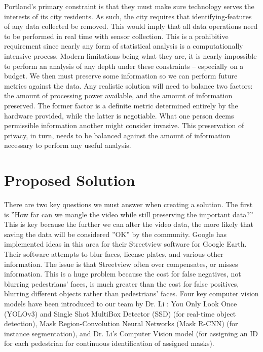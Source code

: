 Portland's primary constraint is that they must make sure technology serves the interests of its city residents. As such, the city requires that identifying-features of any data collected be removed. This would imply that all data operations need to be performed in real time with sensor collection. This is a prohibitive requirement since nearly any form of statistical analysis is a computationally intensive process. Modern limitations being what they are, it is nearly impossible to perform an analysis of any depth under these constraints -- especially on a budget. We then must preserve some information so we can perform future metrics against the data. Any realistic solution will need to balance two factors: the amount of processing power available, and the amount of information preserved. The former factor is a definite metric determined entirely by the hardware provided, while the latter is negotiable. What one person deems permissible information another might consider invasive. This preservation of privacy, in turn, needs to be balanced against the amount of information necessary to perform any useful analysis.

\section{Proposed Solution}

There are two key questions we must answer when creating a solution. The first is ''How far can we mangle the video while still preserving the important data?'' This is key because the further we can alter the video data, the more likely that saving the data will be considered ''OK'' by the community. Google has implemented ideas in this area for their Streetview software for Google Earth. Their software attempts to blur faces, license plates, and various other information. The issue is that Streetview often over compensates, or misses information. This is a huge problem because the cost for false negatives, not blurring pedestrians' faces, is much greater than the cost for false positives, blurring different objects rather than pedestrians' faces. Four key computer vision models have been introduced to our team by Dr. Li \cite{li}: You Only Look Once (YOLOv3) \cite{YOLOv3} and Single Shot MultiBox Detector (SSD) \cite{SSD} (for real-time object detection), Mask Region-Convolution Neural Networks (Mask R-CNN) \cite{maskrcnn} (for instance segmentation), and Dr. Li's Computer Vision model \cite{limodel} (for assigning an ID for each pedestrian for continuous identification of assigned masks).

